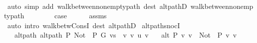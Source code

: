 \begin{isabellebody}
\ \ \ \ \isamarkupfalse%
\ {\isacharparenleft}{\kern0pt}auto\ simp\ add{\isacharcolon}{\kern0pt}\ walk{\isacharunderscore}{\kern0pt}between{\isacharunderscore}{\kern0pt}nonempty{\isacharunderscore}{\kern0pt}path{\isacharparenleft}{\kern0pt}{}{\isacharparenright}{\kern0pt}\ dest{\isacharcolon}{\kern0pt}\ alt{\isacharunderscore}{\kern0pt}pathD{\isacharparenleft}{\kern0pt}{}{\isacharparenright}{\kern0pt}\ walk{\isacharunderscore}{\kern0pt}between{\isacharunderscore}{\kern0pt}nonempty{\isacharunderscore}{\kern0pt}path{\isacharparenleft}{\kern0pt}{}{\isacharparenright}{\kern0pt}{\isacharparenright}{\kern0pt}\isanewline
{}\isamarkupfalse%
\isanewline
\ \ \isamarkupfalse%
\ {}\isanewline
\ \ \isamarkupfalse%
\ {\isacharquery}{\kern0pt}case\isanewline
\ \ \ \ \isamarkupfalse%
\ assms{\isacharparenleft}{\kern0pt}{}{\isacharcomma}{\kern0pt}\ {}{\isacharparenright}{\kern0pt}\isanewline
\ \ \ \ \isamarkupfalse%
\ {\isacharparenleft}{\kern0pt}auto\ intro{\isacharcolon}{\kern0pt}\ walk{\isacharunderscore}{\kern0pt}betw{\isacharunderscore}{\kern0pt}ConsI\ dest{\isacharcolon}{\kern0pt}\ alt{\isacharunderscore}{\kern0pt}pathD{\isacharparenleft}{\kern0pt}{}{\isacharparenright}{\kern0pt}{\isacharparenright}{\kern0pt}\isanewline
{}\isamarkupfalse%
%
\endisatagproof
{\isafoldproof}%
%
\isadelimproof
\isanewline
%
\endisadelimproof
\isanewline
{}\isamarkupfalse%
\ alt{\isacharunderscore}{\kern0pt}path{\isacharunderscore}{\kern0pt}snocI{\isacharcolon}{\kern0pt}\isanewline
\ \ \ alt{\isacharunderscore}{\kern0pt}path{\isacharcolon}{\kern0pt}\ {\isachardoublequoteopen}alt{\isacharunderscore}{\kern0pt}path\ P\ {\isacharparenleft}{\kern0pt}Not\ {\isasymcirc}\ P{\isacharparenright}{\kern0pt}\ G\ {\isacharparenleft}{\kern0pt}vs\ {\isacharat}{\kern0pt}\ {\isacharbrackleft}{\kern0pt}v{\isacharprime}{\kern0pt}{\isacharprime}{\kern0pt}{\isacharcomma}{\kern0pt}\ v{\isacharprime}{\kern0pt}{\isacharbrackright}{\kern0pt}{\isacharparenright}{\kern0pt}\ u\ v{\isacharprime}{\kern0pt}{\isachardoublequoteclose}\isanewline
\ \ \ alt{\isacharcolon}{\kern0pt}\ {\isachardoublequoteopen}P\ {\isacharbraceleft}{\kern0pt}v{\isacharprime}{\kern0pt}{\isacharprime}{\kern0pt}{\isacharcomma}{\kern0pt}\ v{\isacharprime}{\kern0pt}{\isacharbraceright}{\kern0pt}\ {\isacharequal}{\kern0pt}\ {\isacharparenleft}{\kern0pt}Not\ {\isasymcirc}\ P{\isacharparenright}{\kern0pt}\ {\isacharbraceleft}{\kern0pt}v{\isacharprime}{\kern0pt}{\isacharcomma}{\kern0pt}\ v{\isacharbraceright}{\kern0pt}{\isachardoublequoteclose}\isanewline

\end{isabellebody}
